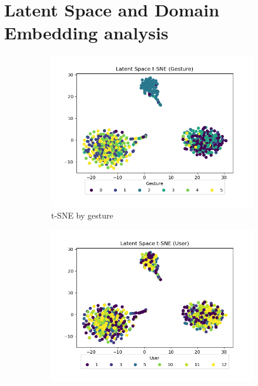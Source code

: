 \section{Latent Space and Domain Embedding analysis}\label{sec:discussion-ls-de-analysis}

\begin{figure}
	\centering
	\begin{subfigure}{0.3\textwidth}
		\centering
		\includegraphics[width=\textwidth]{figures/mtf-ppo-one/ls-gesture}
		\caption{t-SNE by gesture}
		\label{fig:mtf-ppo-one-ls-gesture}
	\end{subfigure}
	\hfill
	\begin{subfigure}{0.3\textwidth}
		\centering
		\includegraphics[width=\textwidth]{figures/mtf-ppo-one/ls-user}

\end{subfigure}
\end{figure}
